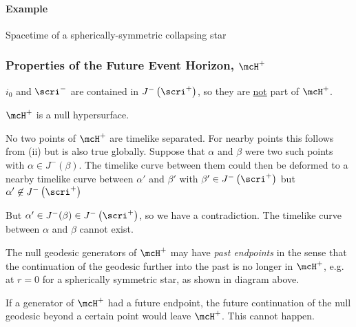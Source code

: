 \paragraph{Example}  Spacetime of a spherically-symmetric collapsing star
\begin{center}\end{center}

\subsubsection{Properties of the Future Event Horizon, $\mcH^+$}
\begin{list}{()}
{}
\item $i_0$ and $\scri^-$ are contained in $J^-\left(\scri^+\right)$, so 
they are \ul{not} part of $\mcH^+$.

\item $\mcH^+$ is a null hypersurface.

\item No two points of $\mcH^+$ are timelike separated.  For nearby points 
this follows from (ii) but is also true globally.  Suppose that $\alpha$ and
$\beta$ were two such points with $\alpha\in J^-(\beta)$.  The timelike curve
between them could then be deformed to a nearby timelike curve between $\alpha'$
and $\beta'$ with $\beta'\in J^-\left(\scri^+\right)$ but $\alpha'\not\in
J^-\left(\scri^+\right)$
\begin{center}\end{center}
But $\alpha'\in J^-(\beta)\in J^-\left(\scri^+\right)$, so we have a 
contradiction.  The timelike curve between $\alpha$ and $\beta$ cannot exist.

\item The null geodesic generators of $\mcH^+$ may have \emph{past endpoints} 
in the sense that the continuation of the geodesic further into the past is no
longer in $\mcH^+$, e.g. at $r=0$ for a spherically symmetric star, as shown in
diagram above.

\item If a generator of $\mcH^+$ had a future endpoint, the future continuation 
of the null geodesic beyond a certain point would leave $\mcH^+$.  This cannot
happen.

\end{list}


